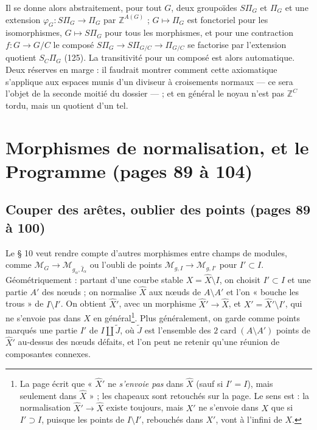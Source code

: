 \documentclass[11pt,a4paper]{article}
\begin{document}
Il se donne alors abstraitement, pour tout $G$, deux groupoïdes $S\Pi_G$ et
$\Pi_G$ et une extension $\varphi_G : S\Pi_G \to \Pi_G$ par $\mathbb{Z}^{A(G)}$ ;
$G \mapsto \Pi_G$ est fonctoriel pour les isomorphismes, $G \mapsto S\Pi_G$ pour
tous les morphismes, et pour une contraction $f : G \to G/C$ le composé $S\Pi_G \to
S\Pi_{G/C} \to \Pi_{G/C}$ se factorise par l'extension quotient $S_C\Pi_G$ (125).
La transitivité pour un composé est alors automatique. Deux réserves en marge : il
faudrait montrer comment cette axiomatique s'applique aux espaces munis d'un
diviseur à croisements normaux — ce sera l'objet de la seconde moitié du
dossier — ; et en général le noyau n'est pas $\mathbb{Z}^C$ tordu, mais un quotient
d'un tel.

\section*{Morphismes de normalisation, et le Programme (pages 89 à 104)}

\subsection*{Couper des arêtes, oublier des points (pages 89 à 100)}

Le § 10 veut rendre compte d'autres morphismes entre champs de modules, comme
$\mathcal{M}_G \to \mathcal{M}_{g_\alpha, \widehat{I}_\alpha}$ ou l'oubli de points
$\mathcal{M}_{g,I} \to \mathcal{M}_{g,I'}$ pour $I' \subset I$. Géométriquement :
partant d'une courbe stable $X = \widehat{X} \setminus I$, on choisit $I' \subset
I$ et une partie $A'$ des nœuds ; on normalise $\widehat{X}$ aux nœuds de $A
\setminus A'$ et l'on « bouche les trous » de $I \setminus I'$. On obtient
$\widehat{X}'$, avec un morphisme $\widehat{X}' \to \widehat{X}$, et $X' =
\widehat{X}' \setminus I'$, qui ne s'envoie pas dans $X$ en général\footnote{La
page écrit que « $\widehat{X}'$ ne \emph{s'envoie pas} dans $\widehat{X}$ (sauf si
$I' = I$), mais seulement dans $\widehat{X}$ » ; les chapeaux sont retouchés sur
la page. Le sens est : la normalisation $\widehat{X}' \to \widehat{X}$ existe
toujours, mais $X'$ ne s'envoie dans $X$ que si $I' \supset I$, puisque les points
de $I \setminus I'$, rebouchés dans $X'$, vont à l'infini de $X$.}. Plus
généralement, on garde comme points marqués une partie $I'$ de $I \amalg
\widetilde{J}$, où $\widetilde{J}$ est l'ensemble des $2\operatorname{card}(A
\setminus A')$ points de $\widehat{X}'$ au-dessus des nœuds défaits, et l'on peut
ne retenir qu'une réunion de composantes connexes.
\end{document}

